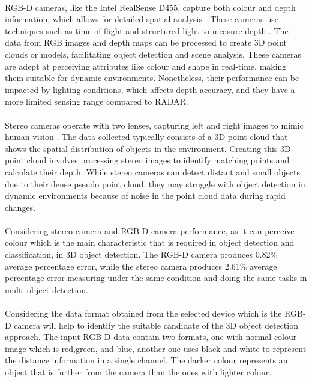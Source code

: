 \paragraph*{}
RGB-D cameras, like the Intel RealSense D455, capture both colour and depth information, which allows for detailed spatial analysis \cite{tychola2022reconstruction}. These cameras use techniques such as time-of-flight and structured light to measure depth \cite{tychola2022reconstruction}. The data from RGB images and depth maps can be processed to create 3D point clouds or models, facilitating object detection and scene analysis. These cameras are adept at perceiving attributes like colour and shape in real-time, making them suitable for dynamic environments. Nonetheless, their performance can be impacted by lighting conditions, which affects depth accuracy, and they have a more limited sensing range compared to RADAR.

\paragraph*{}
Stereo cameras operate with two lenses, capturing left and right images to mimic human vision \cite{medathati2016bio}. The data collected typically consists of a 3D point cloud that shows the spatial distribution of objects in the environment. Creating this 3D point cloud involves processing stereo images to identify matching points and calculate their depth. While stereo cameras can detect distant and small objects due to their dense pseudo point cloud\cite{li2024object}, they may struggle with object detection in dynamic environments because of noise in the point cloud data during rapid changes\cite{eppenberger2020leveraging}.

\paragraph*{}
Considering stereo camera and RGB-D camera performance, as it can perceive colour which is the main characteristic that is required in object detection and classification, in 3D object detection. The RGB-D camera produces 0.82\% average percentage error, while the stereo camera produces 2.61\% average percentage error measuring under the same condition and doing the same tasks in multi-object detection\cite{rodriguez2021comparison}. 

\paragraph*{}
Considering the data format obtained from the selected device which is the RGB-D camera will help to identify the suitable candidate of the 3D object detection approach. The input RGB-D data contain two formats, one with normal colour image which is red,green, and blue, another one uses black and white to represent the distance information in a single channel, The darker colour represents an object that is further from the camera than the ones with lighter colour. 

